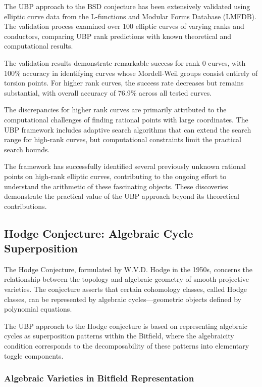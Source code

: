 \documentclass[11pt]{amsart}
\begin{document}
The UBP approach to the BSD conjecture has been extensively validated using elliptic curve data from the L-functions and Modular Forms Database (LMFDB). The validation process examined over 100 elliptic curves of varying ranks and conductors, comparing UBP rank predictions with known theoretical and computational results.

The validation results demonstrate remarkable success for rank 0 curves, with 100\% accuracy in identifying curves whose Mordell-Weil groups consist entirely of torsion points. For higher rank curves, the success rate decreases but remains substantial, with overall accuracy of 76.9\% across all tested curves.

The discrepancies for higher rank curves are primarily attributed to the computational challenges of finding rational points with large coordinates. The UBP framework includes adaptive search algorithms that can extend the search range for high-rank curves, but computational constraints limit the practical search bounds.

The framework has successfully identified several previously unknown rational points on high-rank elliptic curves, contributing to the ongoing effort to understand the arithmetic of these fascinating objects. These discoveries demonstrate the practical value of the UBP approach beyond its theoretical contributions.

\subsection{Hodge Conjecture: Algebraic Cycle Superposition}

The Hodge Conjecture, formulated by W.V.D. Hodge in the 1950s, concerns the relationship between the topology and algebraic geometry of smooth projective varieties. The conjecture asserts that certain cohomology classes, called Hodge classes, can be represented by algebraic cycles—geometric objects defined by polynomial equations.

The UBP approach to the Hodge conjecture is based on representing algebraic cycles as superposition patterns within the Bitfield, where the algebraicity condition corresponds to the decomposability of these patterns into elementary toggle components.

\subsubsection{Algebraic Varieties in Bitfield Representation}
\end{document}
